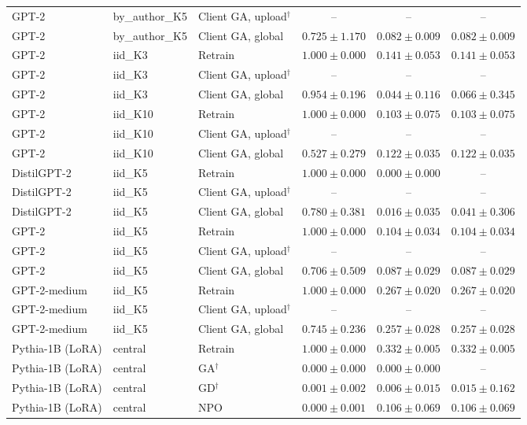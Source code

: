 {\begin{longtable}{@{\extracolsep{\fill}}lllccc@{}}
GPT-2 & by\_author\_K5 & Client GA, upload$^{\dagger}$ & -- & -- & -- \\
GPT-2 & by\_author\_K5 & Client GA, global & $0.725 \pm 1.170$ & $0.082 \pm 0.009$ & $0.082 \pm 0.009$ \\
GPT-2 & iid\_K3 & Retrain & $1.000 \pm 0.000$ & $0.141 \pm 0.053$ & $0.141 \pm 0.053$ \\
GPT-2 & iid\_K3 & Client GA, upload$^{\dagger}$ & -- & -- & -- \\
GPT-2 & iid\_K3 & Client GA, global & $0.954 \pm 0.196$ & $0.044 \pm 0.116$ & $0.066 \pm 0.345$ \\
GPT-2 & iid\_K10 & Retrain & $1.000 \pm 0.000$ & $0.103 \pm 0.075$ & $0.103 \pm 0.075$ \\
GPT-2 & iid\_K10 & Client GA, upload$^{\dagger}$ & -- & -- & -- \\
GPT-2 & iid\_K10 & Client GA, global & $0.527 \pm 0.279$ & $0.122 \pm 0.035$ & $0.122 \pm 0.035$ \\
DistilGPT-2 & iid\_K5 & Retrain & $1.000 \pm 0.000$ & $0.000 \pm 0.000$ & -- \\
DistilGPT-2 & iid\_K5 & Client GA, upload$^{\dagger}$ & -- & -- & -- \\
DistilGPT-2 & iid\_K5 & Client GA, global & $0.780 \pm 0.381$ & $0.016 \pm 0.035$ & $0.041 \pm 0.306$ \\
GPT-2 & iid\_K5 & Retrain & $1.000 \pm 0.000$ & $0.104 \pm 0.034$ & $0.104 \pm 0.034$ \\
GPT-2 & iid\_K5 & Client GA, upload$^{\dagger}$ & -- & -- & -- \\
GPT-2 & iid\_K5 & Client GA, global & $0.706 \pm 0.509$ & $0.087 \pm 0.029$ & $0.087 \pm 0.029$ \\
GPT-2-medium & iid\_K5 & Retrain & $1.000 \pm 0.000$ & $0.267 \pm 0.020$ & $0.267 \pm 0.020$ \\
GPT-2-medium & iid\_K5 & Client GA, upload$^{\dagger}$ & -- & -- & -- \\
GPT-2-medium & iid\_K5 & Client GA, global & $0.745 \pm 0.236$ & $0.257 \pm 0.028$ & $0.257 \pm 0.028$ \\
Pythia-1B (LoRA) & central & Retrain & $1.000 \pm 0.000$ & $0.332 \pm 0.005$ & $0.332 \pm 0.005$ \\
Pythia-1B (LoRA) & central & GA$^{\dagger}$ & $0.000 \pm 0.000$ & $0.000 \pm 0.000$ & -- \\
Pythia-1B (LoRA) & central & GD$^{\dagger}$ & $0.001 \pm 0.002$ & $0.006 \pm 0.015$ & $0.015 \pm 0.162$ \\
Pythia-1B (LoRA) & central & NPO & $0.000 \pm 0.001$ & $0.106 \pm 0.069$ & $0.106 \pm 0.069$ \\

\end{longtable}}

